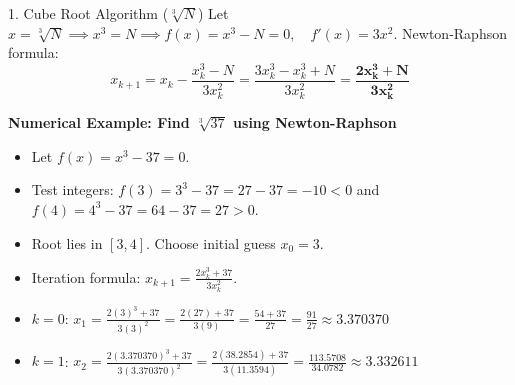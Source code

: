 \documentclass[11pt,a4paper]{article}
\begin{document}
\begin{formulabox}{1. Cube Root Algorithm ($\sqrt[3]{N}$)}
Let $x = \sqrt[3]{N} \implies x^3 = N \implies f(x) = x^3 - N = 0, \quad f'(x) = 3x^2$.
Newton-Raphson formula:
\begin{equation}
    x_{k+1} = x_k - \frac{x_k^3 - N}{3x_k^2} = \frac{3x_k^3 - x_k^3 + N}{3x_k^2} = \mathbf{\frac{2x_k^3 + N}{3x_k^2}}
\end{equation}

\textbf{Numerical Example: Find $\sqrt[3]{37}$ using Newton-Raphson}
\begin{itemize}
    \item Let $f(x) = x^3 - 37 = 0$.
    \item Test integers: $f(3) = 3^3 - 37 = 27 - 37 = -10 < 0$ and $f(4) = 4^3 - 37 = 64 - 37 = 27 > 0$.
    \item Root lies in $[3, 4]$. Choose initial guess $x_0 = 3$.
    \item Iteration formula: $x_{k+1} = \frac{2x_k^3 + 37}{3x_k^2}$.
    \item $k=0$: $x_1 = \frac{2(3)^3 + 37}{3(3)^2} = \frac{2(27) + 37}{3(9)} = \frac{54 + 37}{27} = \frac{91}{27} \approx \mathbf{3.370370}$
    \item $k=1$: $x_2 = \frac{2(3.370370)^3 + 37}{3(3.370370)^2} = \frac{2(38.2854) + 37}{3(11.3594)} = \frac{113.5708}{34.0782} \approx \mathbf{3.332611}$
\end{itemize}
\end{formulabox}

\newpage
\end{document}

